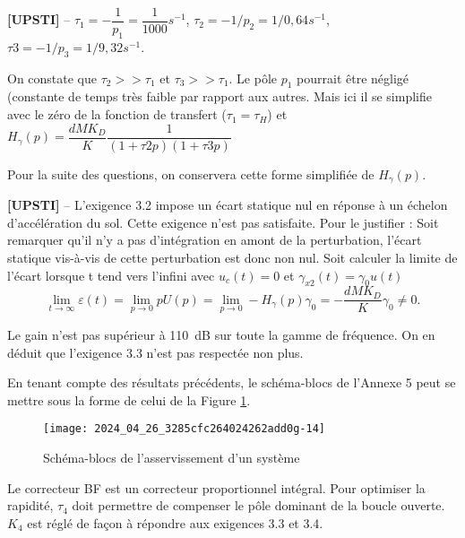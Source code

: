 \ifprof
\begin{corrige}%
\textbf{[UPSTI]} -- 
$\tau_1=-\dfrac{1}{p_1} =\dfrac{1}{1000}\si{s^{-1}}$,  $\tau_2=-1/p_2 =1/0,64 \si{s^{-1}}$,  $\tau3=-1/p_3 =1/9,32\si{s^{-1}}$. 

On constate que $\tau_2 >> \tau_1$ et $\tau_3>> \tau_1$. Le pôle $p_1$ pourrait être négligé (constante de temps très faible par rapport aux autres. Mais ici il se simplifie avec le zéro de la fonction de transfert ($\tau_1=\tau_H$) et 
$H_{\gamma} (p)= \dfrac{dMK_D}{K} \dfrac{ 1}{(1+\tau2 p)(1+\tau3 p)}$

\end{corrige}
\else
\fi


Pour la suite des questions, on conservera cette forme simplifiée de $H_{\gamma}(p)$.

\ifprof
\begin{corrige}%
\textbf{[UPSTI]} -- 
L’exigence 3.2 impose un écart statique nul en réponse à un échelon d’accélération du sol. Cette exigence n’est pas satisfaite. Pour le justifier :
	Soit remarquer qu’il n’y a pas d’intégration en amont de la perturbation, l’écart statique vis-à-vis de cette perturbation est donc non nul.
	Soit calculer la limite de l’écart lorsque t tend vers l’infini avec $u_c (t)=0$ et $\gamma_{x2} (t)= \gamma_0 u(t)$ 
	$$ \lim_{t\to\infty}  \varepsilon(t) 
	= \lim_{p\to 0}  pU(p) 
	= \lim_{p\to 0}-H_{\gamma} (p) \gamma_0 =-\dfrac{dMK_D}{K} \gamma_0 \neq 0.$$

Le gain n’est pas supérieur à \SI{110}{dB} sur toute la gamme de fréquence. On en déduit que l’exigence 3.3 n’est pas respectée non plus.

\end{corrige}
\else
\fi

\ifprof
\else
En tenant compte des résultats précédents, le schéma-blocs de l'Annexe 5 peut se mettre sous la forme de celui de la Figure \ref{ccmp2023_fig_13}.

\begin{figure}[!h]
\centering
\texttt{[image: 2024\_04\_26\_3285cfc264024262add0g-14]}
\caption{\label{ccmp2023_fig_13}  Schéma-blocs de l'asservissement d'un système}
\end{figure}



Le correcteur BF est un correcteur proportionnel intégral. Pour optimiser la rapidité, $\tau_{4}$ doit permettre de compenser le pôle dominant de la boucle ouverte. $K_{4}$ est réglé de façon à répondre aux exigences 3.3 et 3.4.
\fi

